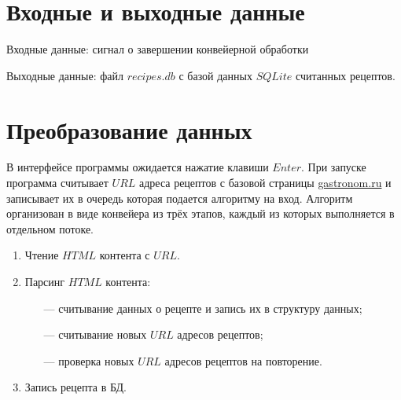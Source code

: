 \chapter{Входные и выходные данные}

Входные данные: сигнал о завершении конвейерной обработки

Выходные данные: файл $recipes.db$ с базой данных $SQLite$ считанных рецептов.

\clearpage

\chapter{Преобразование данных}

В интерфейсе программы ожидается нажатие клавиши $Enter$. При запуске программа считывает $URL$ адреса рецептов с базовой страницы \url{gastronom.ru} и записывает их в очередь которая подается алгоритму на вход. Алгоритм организован в виде конвейера из трёх этапов, каждый из которых выполняется в отдельном потоке.

\begin{enumerate}
    \item Чтение $HTML$ контента с $URL$.
    \item Парсинг $HTML$ контента:
    \begin{itemize}
        \item[---] считывание данных о рецепте и запись их в структуру данных;
        \item[---] считывание новых $URL$ адресов рецептов;
        \item[---] проверка новых $URL$ адресов рецептов на повторение.
    \end{itemize}
    \item Запись рецепта в БД.
\end{enumerate}

\clearpage